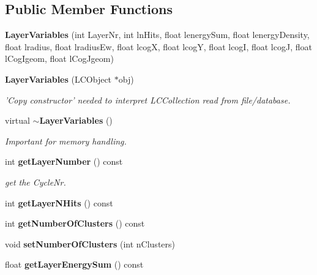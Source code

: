 \subsection*{Public Member Functions}
\begin{DoxyCompactItemize}
\item 
{\bfseries Layer\-Variables} (int Layer\-Nr, int ln\-Hits, float lenergy\-Sum, float lenergy\-Density, float lradius, float lradius\-Ew, float lcog\-X, float lcog\-Y, float lcog\-I, float lcog\-J, float l\-Cog\-Igeom, float l\-Cog\-Jgeom)\label{classCALICE_1_1LayerVariables_ad61ae81bd166e4cc41ce302991ebe7c5}

\item 
{\bf Layer\-Variables} (L\-C\-Object $\ast$obj)\label{classCALICE_1_1LayerVariables_a129a7e9c56c6f603e62a38705c8b7414}

\begin{DoxyCompactList}\small\item\em 'Copy constructor' needed to interpret L\-C\-Collection read from file/database. \end{DoxyCompactList}\item 
virtual {\bf $\sim$\-Layer\-Variables} ()\label{classCALICE_1_1LayerVariables_a1aa754298b75892b34e7a05f5010941a}

\begin{DoxyCompactList}\small\item\em Important for memory handling. \end{DoxyCompactList}\item 
int {\bf get\-Layer\-Number} () const \label{classCALICE_1_1LayerVariables_aa25588a45fcbc9d99d38795e6497502f}

\begin{DoxyCompactList}\small\item\em get the Cycle\-Nr. \end{DoxyCompactList}\item 
int {\bfseries get\-Layer\-N\-Hits} () const \label{classCALICE_1_1LayerVariables_aab5fb04d83bfdc08b332c05ed02a3e46}

\item 
int {\bfseries get\-Number\-Of\-Clusters} () const \label{classCALICE_1_1LayerVariables_a1c2b6508d91a2198421f040e0c219b6d}

\item 
void {\bfseries set\-Number\-Of\-Clusters} (int n\-Clusters)\label{classCALICE_1_1LayerVariables_ad8836dc2c28ea9c6eaa1b14cce6bddc4}

\item 
float {\bfseries get\-Layer\-Energy\-Sum} () const \label{classCALICE_1_1LayerVariables_a41661befc9766fa878d6edeb5b8eeee5}


\end{DoxyCompactItemize}
